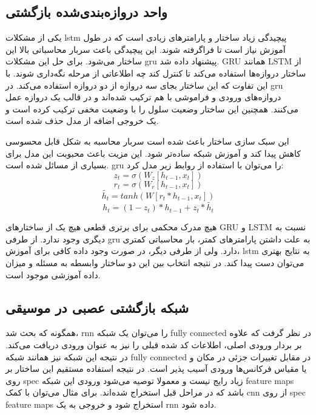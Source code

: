 \subsection{واحد دروازه‌بندی‌شده بازگشتی}
یکی از مشکلات \gls{lstm} پیچیدگی زیاد ساختار و پارامترهای زیادی است که در طول
آموزش نیاز است تا فراگرفته شوند. این پیچیدگی باعث سربار محاسباتی بالا این ساختار
می‌شود. برای حل این مشکلات \gls{gru} پیشنهاد داده شد. \gls{GRU} همانند
\gls{LSTM} از ساختار دروازه‌ها استفاده می‌کند تا کنترل کند چه اطلاعاتی از مرحله
نگه‌داری شوند. با این تفاوت که این ساختار بجای سه دروازه از دو دروازه استفاده
می‌کند. در \gls{gru} دروازه‌های ورودی و فراموشی با هم ترکیب شده‌اند و در قالب یک
دروازه عمل می‌کنند. همچنین این ساختار وضعیت سلول را با وضعیت مخفی ترکیب کرده است
و یک خروجی اضافه از مدل حذف شده است.

این سبک سازی ساختار باعث شده است سربار محاسبه به شکل قابل محسوسی کاهش پیدا کند و
آموزش شبکه ساده‌تر شود. این مزیت باعث محبوبت این مدل برای بسیاری از مسائل شده
است. \gls{gru} را می‌توان با استفاده از روابط زیر مدل کرد:
\begin{equation}
    z_t = \sigma(W_z [h_{t-1},x_t])
\end{equation}
\begin{equation}
    r_t = \sigma(W_r [h_{t-1},x_t])
\end{equation}
\begin{equation}
    \tilde{h_t} = tanh(W [r_t * h_{t-1}, x_t])
\end{equation}
\begin{equation}
    h_t = (1 - z_t) * h_{t-1} + z_t * \tilde{h_t}
\end{equation}

هیچ مدرک محکمی برای برتری قطعی هیچ یک از ساختارهای \gls{GRU} و \gls{LSTM} نسبت
به دیگری وجود ندارد. از طرفی \gls{gru} به علت داشتن پارامترهای کمتر، بار
محاسباتی کمتری دارد. ولی از طرفی دیگر، در صورت وجود داده کافی برای آموزش،
\gls{lstm} به نتایج بهتری می‌توان دست پیدا کند. در نتیجه انتخاب بین این دو
ساختار وابسطه به مسئله و میزان داده آموزشی موجود است.

\subsection{شبکه بازگشتی عصبی در موسیقی}
همگونه که بحث شد، \gls{rnn} را می‌توان یک شبکه \gls{fully connected} در نظر گرفت
که علاوه بر بردار ورودی اصلی، اطلاعات کد شده قبلی را نیز به عنوان ورودی دریافت
می‌کند. در نتیجه این شبکه نیز همانند شبکه \gls{fully connected} در مقابل تغییرات
جزئی در مکان و یا مقیاس فرکانس‌ها ورودی آسیب پذیر است. در نتیجه استفاده مستقیم
این ساختار بر روی \gls{spec} زیاد رایج نیست و معمولا توصیه می‌شود ورودی این
شبکه \glspl{feature map} باشد که در مراحل قبل استخراج شده‌اند. برای مثال می‌توان
با کمک \gls{cnn} از روی \gls{spec} \glspl{feature map} استخراج شود و خروجی به یک
\gls{rnn} داده شود.

